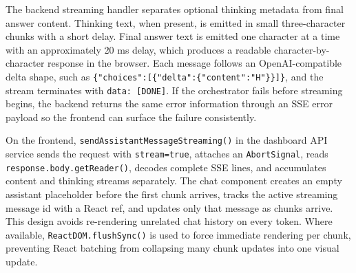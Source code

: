 The backend streaming handler separates optional thinking metadata from final answer content. Thinking text, when present, is emitted in small three-character chunks with a short delay. Final answer text is emitted one character at a time with an approximately 20 ms delay, which produces a readable character-by-character response in the browser. Each message follows an OpenAI-compatible delta shape, such as \texttt{\{"choices":[\{"delta":\{"content":"H"\}\}]\}}, and the stream terminates with \texttt{data: [DONE]}. If the orchestrator fails before streaming begins, the backend returns the same error information through an SSE error payload so the frontend can surface the failure consistently.

On the frontend, \texttt{sendAssistantMessageStreaming()} in the dashboard API service sends the request with \texttt{stream=true}, attaches an \texttt{AbortSignal}, reads \texttt{response.body.getReader()}, decodes complete SSE lines, and accumulates content and thinking streams separately. The chat component creates an empty assistant placeholder before the first chunk arrives, tracks the active streaming message id with a React ref, and updates only that message as chunks arrive. This design avoids re-rendering unrelated chat history on every token. Where available, \texttt{ReactDOM.flushSync()} is used to force immediate rendering per chunk, preventing React batching from collapsing many chunk updates into one visual update.

